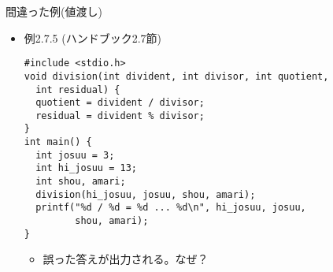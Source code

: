\begin{frame}[t,fragile]{間違った例(値渡し)}
  \begin{itemize}
  \item 例2.7.5 (ハンドブック2.7節)
\begin{lstlisting}
#include <stdio.h>
void division(int divident, int divisor, int quotient,
  int residual) {
  quotient = divident / divisor;
  residual = divident % divisor;
}
int main() {
  int josuu = 3;
  int hi_josuu = 13;
  int shou, amari;
  division(hi_josuu, josuu, shou, amari);
  printf("%d / %d = %d ... %d\n", hi_josuu, josuu,
         shou, amari);
}
\end{lstlisting}
\begin{itemize}
\item 誤った答えが出力される。なぜ？
\end{itemize}
  \end{itemize}
\end{frame}
